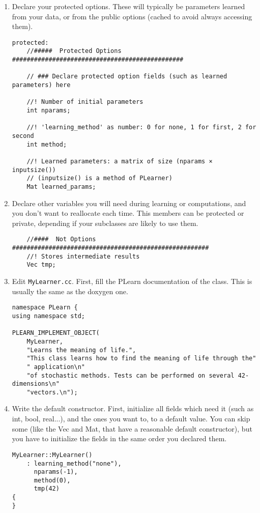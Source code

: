 \documentclass[11pt]{book}
\begin{document}
\begin{enumerate}
\item Declare your protected options. These will typically be parameters
learned from your data, or from the public options (cached to avoid
always accessing them).
\begin{verbatim}
protected:
    //#####  Protected Options  ###############################################

    // ### Declare protected option fields (such as learned parameters) here

    //! Number of initial parameters
    int nparams;

    //! 'learning_method' as number: 0 for none, 1 for first, 2 for second
    int method;

    //! Learned parameters: a matrix of size (nparams × inputsize())
    // (inputsize() is a method of PLearner)
    Mat learned_params;
\end{verbatim}

\item Declare other variables you will need during learning or
computations, and you don't want to reallocate each time. This members
can be protected or private, depending if your subclasses are likely to
use them.
\begin{verbatim}
    //####  Not Options  ######################################################
    //! Stores intermediate results
    Vec tmp;
\end{verbatim}

\item Edit {\tt MyLearner.cc}. First, fill the PLearn documentation of
the class. This is usually the same as the doxygen one.
\begin{verbatim}
namespace PLearn {
using namespace std;

PLEARN_IMPLEMENT_OBJECT(
    MyLearner,
    "Learns the meaning of life.",
    "This class learns how to find the meaning of life through the"
    " application\n"
    "of stochastic methods. Tests can be performed on several 42-dimensions\n"
    "vectors.\n");
\end{verbatim}

\item Write the default constructor. First, initialize all fields which
need it (such as int, bool, real...), and the ones you want to, to a
default value. You can skip some (like the Vec and Mat, that have a
reasonable default constructor), but you have to initialize the fields
in the same order you declared them.
\begin{verbatim}
MyLearner::MyLearner()
    : learning_method("none"),
      nparams(-1),
      method(0),
      tmp(42)
{
}
\end{verbatim}


\end{enumerate}
\end{document}
